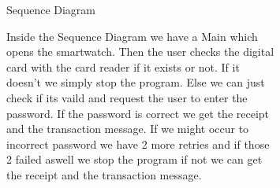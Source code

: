 \documentclass{article}
\begin{document}
		\begin{figure}[htbp]
			\centering
			\begin{subfigure}{\textwidth}
				\resizebox{\textwidth}{!}{}
				\caption{Sequence Diagram}
			\end{subfigure}
			\begin{subfigure}{\textwidth}
				Inside the Sequence Diagram we have a Main which opens the smartwatch. Then the user checks the digital card with the 
				card reader if it exists or not. If it doesn't we simply stop the program. Else we can just check if its vaild and request the 
				user to enter the password. If the password is correct we get the receipt and the transaction message. If we might occur to incorrect 
				password we have 2 more retries and if those 2 failed aswell we stop the program if not we can get the receipt and the transaction
				message. 
			\end{subfigure}
		\end{figure}
		\newpage
\end{document}
